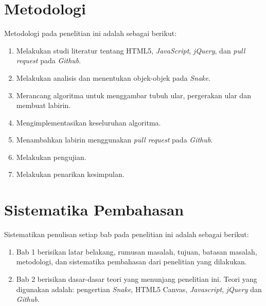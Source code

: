 \section{Metodologi}
\label{sec:metlit}
Metodologi pada penelitian ini adalah sebagai berikut:
\begin{enumerate}
	\item Melakukan studi literatur tentang HTML5, \textit{JavaScript}, \textit{jQuery}, dan \textit{pull request} pada \textit{Github}.
	\item Melakukan analisis dan menentukan objek-objek pada \textit{Snake}.
	\item Merancang algoritma untuk menggambar tubuh ular, pergerakan ular dan membuat labirin.
	\item Mengimplementasikan keseluruhan algoritma.
	\item Menambahkan labirin menggunakan \textit{pull request} pada \textit{Github}.
	\item Melakukan pengujian.
	\item Melakukan penarikan kesimpulan. 
\end{enumerate}


\section{Sistematika Pembahasan}
\label{sec:sispem}
Sistematikan penulisan setiap bab pada penelitian ini adalah sebagai berikut:
\begin{enumerate}
	\item Bab 1 berisikan latar belakang, rumusan masalah, tujuan, batasan masalah, metodologi, dan sistematika pembahasan dari penelitian yang dilakukan.
	\item Bab 2 berisikan dasar-dasar teori yang menunjang penelitian ini. Teori yang digunakan adalah: pengertian \textit{Snake}, HTML5 Canvas, \textit{Javascript}, \textit{jQuery} dan \textit{Github}.
\end{enumerate}